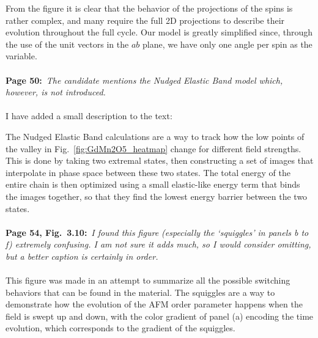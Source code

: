 \documentclass[a4, UTF8]{article}
\begin{document}
From the figure it is clear that the behavior of the projections of the spins is rather complex, and many require the full 2D projections to describe their evolution throughout the full cycle.
Our model is greatly simplified since, through the use of the unit vectors in the $ab$ plane, we have only one angle per spin as the variable.
\\\\
{\bf Page 50:}~{\it The candidate mentions the Nudged Elastic Band model which, however, is not introduced.}
\\\\
I have added a small description to the text:

The Nudged Elastic Band calculations are a way to track how the low points of the valley in Fig.~\ref{fig:GdMn2O5_heatmap} change for different field strengths.
This is done by taking two extremal states, then constructing a set of images that interpolate in phase space between these two states. The total energy of the entire chain is then optimized using a small elastic-like energy term that binds the images together, so that they find the lowest energy barrier between the two states.  
\\\\
{\bf Page 54, Fig.~3.10:}~{\it I found this figure (especially the `squiggles' in panels b to f) extremely confusing. I am not sure it adds much, so I would consider omitting, but a better caption is certainly in order.}
\\\\
This figure was made in an attempt to summarize all the possible switching behaviors that can be found in the material. The squiggles are a way to demonstrate how the evolution of the AFM order parameter happens when the field is swept up and down, with the color gradient of panel (a) encoding the time evolution, which corresponds to the gradient of the squiggles.
\end{document}
